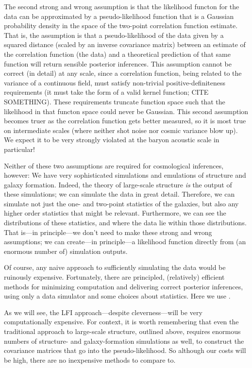 The second strong and wrong assumption is that the likelihood functon for the data can
be approximated by a pseudo-likelihood function that is a Gaussian probability density
in the space of the two-point correlation function estimate.
That is, the assumption is that a pseudo-likelihood of the data given by a squared distance
(scaled by an inverse covariance matrix) between an estimate of the correlation function
(the data) and a theoretical prediction of that same function will return sensible posterior
inferences.
This assumption cannot be correct (in detail) at any scale, since a correlation function,
being related to the variance of a continuous field,
must satisfy non-trivial positive-definiteness
requirements (it must take the form of a valid kernel function; CITE SOMETHING).
These requirements truncate function space such that the likelihood in that functon space
could never be Gaussian.
This second assumption becomes truer as the correlation function gets better measured, so
it is most true on intermediate scales (where neither shot noise nor cosmic variance blow up).
We expect it to be very strongly violated at the baryon acoustic scale in particular!

Neither of these two assumptions are required for cosmological inferences, however:
We have very sophisticated simulations and emulations of structure and galaxy formation.
Indeed, the theory of large-scale structure \emph{is} the output of these simulations;
we can simulate the data in great detail.
Therefore, we can simulate not just the one- and two-point statistics of the galaxies,
but also any higher order statistics that might be relevant.
Furthermore, we can see the distributions of these statistics, and where the data lie within
those distributions.
That is---in principle---we don't need to make these strong and wrong assumptions;
we can create---in principle---a likelihood function directly from (an enormous number of)
simulation outputs.

Of course, any naive approach to sufficiently simulating the data would be ruinously
expensive.
Fortunately, there are principled, (relatively) efficient methods for minimizing computation
and delivering correct posterior inferences,
using only a data simulator and some choices about statistics.
Here we use .

As we will see, the LFI approach---despite cleverness---will be very computationally expensive.
For context, it is worth remembering that even the traditional approach to large-scale structure,
outlined above, requires enormous numbers of structure- and galaxy-formation simulations as well,
to construct the covariance matrices that go into the pseudo-likelihood.
So although our costs will be high, there are no inexpensive methods to compare to.

